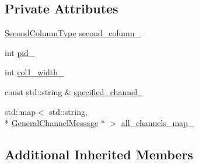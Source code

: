 \subsection*{Private Attributes}
\begin{DoxyCompactItemize}
\item 
\hyperlink{classCyberTopologyMessage_a19a78ae56d2bd909e1b1403b3db83c52}{Second\-Column\-Type} \hyperlink{classCyberTopologyMessage_a1154eec678920dfada21e1f406dc28d0}{second\-\_\-column\-\_\-}
\item 
int \hyperlink{classCyberTopologyMessage_a3cc7dce72601c852f9f602f242b72e73}{pid\-\_\-}
\item 
int \hyperlink{classCyberTopologyMessage_ac3a5fef5a512872150261b3c32fafc60}{col1\-\_\-width\-\_\-}
\item 
const std\-::string \& \hyperlink{classCyberTopologyMessage_a5896a556d8bfbe583d112690f025a063}{specified\-\_\-channel\-\_\-}
\item 
std\-::map$<$ std\-::string, \\*
\hyperlink{classGeneralChannelMessage}{General\-Channel\-Message} $\ast$ $>$ \hyperlink{classCyberTopologyMessage_a982b69f726e8f42a1c3a0389865d84f8}{all\-\_\-channels\-\_\-map\-\_\-}
\end{DoxyCompactItemize}
\subsection*{Additional Inherited Members}


